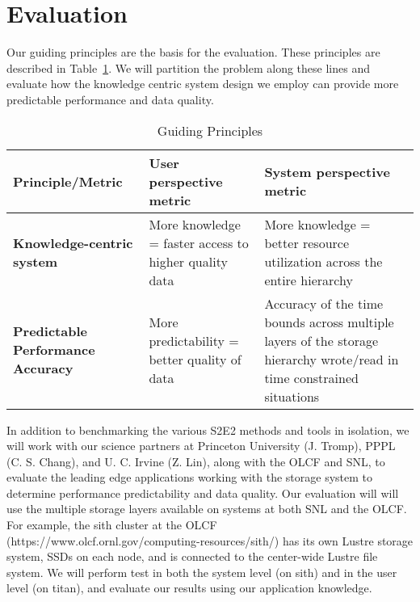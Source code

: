 \section{Evaluation}
\label{sec:evaluation}

Our guiding principles are the basis for the evaluation. These principles are
described in Table~\ref{table:eval}.  We will partition the problem along these
lines and evaluate how the knowledge centric system design we employ can
provide more predictable performance and data quality. 

\begin{table}[ht]

\label{table:eval}
\centering
\begin{tabular}{ | p{1.4in} | p{2in} | p{2.5in} | }
  \hline
  {\bf Principle/Metric}                   & {\bf User perspective metric}   & {\bf System perspective metric }\\ \hline
  {\bf Knowledge-centric system}           & More knowledge = faster access to higher quality data &  More knowledge = better resource utilization across the entire hierarchy \\ \hline
  {\bf Predictable Performance Accuracy}   & More predictability = better quality of data &  Accuracy of the time bounds across multiple layers of the storage hierarchy wrote/read in time constrained situations\\ \hline
\end{tabular}
\caption{Guiding Principles}
\end{table}

In addition to benchmarking the various S2E2 methods and tools in isolation,
we will work with our science partners at Princeton University (J. Tromp),
PPPL (C. S. Chang), and U. C. Irvine (Z. Lin), along with the OLCF and SNL,
to evaluate the leading edge applications working with the storage system to
determine performance predictability and data quality.  Our evaluation will
will use the multiple storage layers available on systems at both SNL and the
OLCF.  For example, the sith cluster at the OLCF
(https://www.olcf.ornl.gov/computing-resources/sith/) has its own Lustre
storage system, SSDs on each node, and is connected to the center-wide Lustre
file system. We will perform test in both the system level (on sith) and in
the user level (on titan), and evaluate our results using our application
knowledge.

